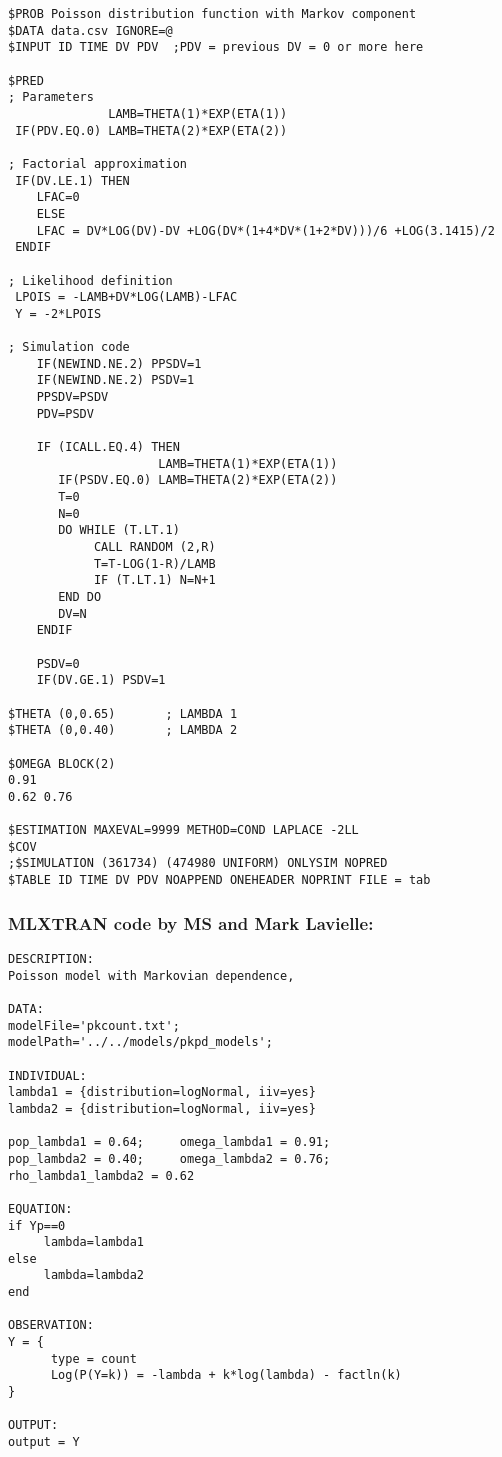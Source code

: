 \lstset{language=NONMEMdataSet}
\begin{lstlisting}
$PROB Poisson distribution function with Markov component
$DATA data.csv IGNORE=@
$INPUT ID TIME DV PDV  ;PDV = previous DV = 0 or more here

$PRED
; Parameters
              LAMB=THETA(1)*EXP(ETA(1))
 IF(PDV.EQ.0) LAMB=THETA(2)*EXP(ETA(2))

; Factorial approximation
 IF(DV.LE.1) THEN
    LFAC=0
    ELSE
    LFAC = DV*LOG(DV)-DV +LOG(DV*(1+4*DV*(1+2*DV)))/6 +LOG(3.1415)/2
 ENDIF

; Likelihood definition
 LPOIS = -LAMB+DV*LOG(LAMB)-LFAC
 Y = -2*LPOIS

; Simulation code
    IF(NEWIND.NE.2) PPSDV=1
    IF(NEWIND.NE.2) PSDV=1
    PPSDV=PSDV
    PDV=PSDV

    IF (ICALL.EQ.4) THEN
                     LAMB=THETA(1)*EXP(ETA(1))
       IF(PSDV.EQ.0) LAMB=THETA(2)*EXP(ETA(2))
       T=0
       N=0
       DO WHILE (T.LT.1)
            CALL RANDOM (2,R)
            T=T-LOG(1-R)/LAMB
            IF (T.LT.1) N=N+1
       END DO
       DV=N
    ENDIF

    PSDV=0
    IF(DV.GE.1) PSDV=1

$THETA (0,0.65)       ; LAMBDA 1
$THETA (0,0.40)       ; LAMBDA 2

$OMEGA BLOCK(2)
0.91 
0.62 0.76

$ESTIMATION MAXEVAL=9999 METHOD=COND LAPLACE -2LL
$COV
;$SIMULATION (361734) (474980 UNIFORM) ONLYSIM NOPRED
$TABLE ID TIME DV PDV NOAPPEND ONEHEADER NOPRINT FILE = tab

\end{lstlisting}

\myEndLine

\subsubsection{MLXTRAN code by MS and Mark Lavielle:}

\myStartLine

\lstset{language=MLXTRANcode}
\begin{lstlisting}
DESCRIPTION:
Poisson model with Markovian dependence,

DATA:
modelFile='pkcount.txt';
modelPath='../../models/pkpd_models';

INDIVIDUAL:
lambda1 = {distribution=logNormal, iiv=yes}
lambda2 = {distribution=logNormal, iiv=yes}

pop_lambda1 = 0.64;     omega_lambda1 = 0.91;
pop_lambda2 = 0.40;     omega_lambda2 = 0.76;
rho_lambda1_lambda2 = 0.62

EQUATION:
if Yp==0
     lambda=lambda1
else
     lambda=lambda2
end

OBSERVATION:
Y = {
      type = count
      Log(P(Y=k)) = -lambda + k*log(lambda) - factln(k)
}

OUTPUT: 
output = Y
\end{lstlisting}

